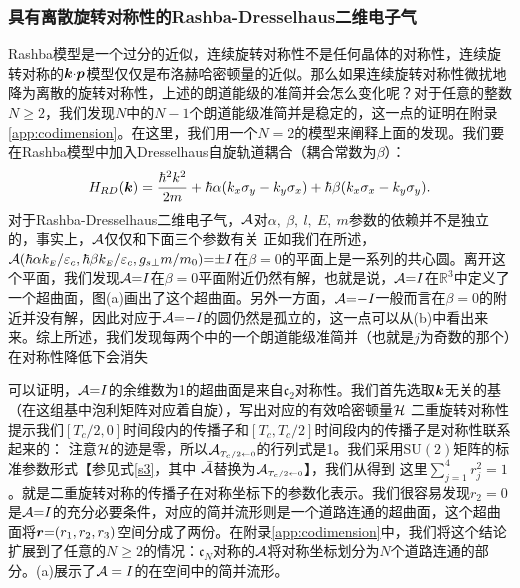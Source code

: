 \subsubsection{具有离散旋转对称性的Rashba-Dresselhaus二维电子气}\label{sec:disrot}

Rashba模型是一个过分的近似，连续旋转对称性不是任何晶体的对称性，连续旋转对称的$\boldsymbol{k}{\cdot}\boldsymbol{p}$模型仅仅是布洛赫哈密顿量的近似。那么如果连续旋转对称性微扰地降为离散的旋转对称性，上述的朗道能级的准简并会怎么变化呢？对于任意的整数$N{\geq}2$，我们发现$N$中的$N{-}1$个朗道能级准简并是稳定的，这一点的证明在附录\ref{app:codimension}。在这里，我们用一个$N{=}2$的模型来阐释上面的发现。我们要在Rashba模型中加入Dresselhaus自旋轨道耦合（耦合常数为$\beta$）：
\begin{equation}
H_{RD}(\boldsymbol{k})=\frac{{\hbar^2}k^2}{2m}+\hbar\alpha(k_{x}\sigma_{y}-k_{y}\sigma_{x})+\hbar\beta(k_{x}\sigma_{x}-k_{y}\sigma_{y}).\label{hamRD}
\end{equation}
对于Rashba-Dresselhaus二维电子气，${\cal A}$对$\alpha,~\beta,~l,~E,~m$参数的依赖并不是独立的，事实上，${\cal A}$仅仅和下面三个参数有关
正如我们在所述，${\cal A}(\hbar\alpha k_{\scriptscriptstyle{E}}/\varepsilon_c,\hbar\beta k_{\scriptscriptstyle{E}}/\varepsilon_c,g_{s\perp}m/m_0){=}{\pm} I$在$\beta{=}0$的平面上是一系列的共心圆。离开这个平面，我们发现${\cal A}{=}I$在$\beta{=}0$平面附近仍然有解，也就是说，${\cal A}{=}I$在$\mathbb{R}^3$中定义了一个超曲面，图(a)画出了这个超曲面。另外一方面，${\cal A}{=}{-}I$一般而言在$\beta{=}0$的附近并没有解，因此对应于${\cal A}{=}{-}I$的圆仍然是孤立的，这一点可以从(b)中看出来来。综上所述，我们发现每两个中的一个朗道能级准简并（也就是$j$为奇数的那个）在对称性降低下会消失

可以证明，${\cal A}{=}I$的余维数为1的超曲面是来自$\mathfrak{c}_2$对称性。我们首先选取$\boldsymbol{k}$无关的基（在这组基中泡利矩阵对应着自旋），写出对应的有效哈密顿量${\cal H}$ 
二重旋转对称性
提示我们$[T_c/2,0]$时间段内的传播子和$[T_c,T_c/2]$时间段内的传播子是对称性联系起来的：
注意${\cal H}$的迹是零，所以${{\cal A}}_{\scriptscriptstyle{T_c/2\leftarrow 0}}$的行列式是1。我们采用$\text{SU}(2)$矩阵的标准参数形式【参见式\ref{s3}，其中 ${\cal \bar{A}}$替换为${{\cal A}}_{\scriptscriptstyle{T_c/2\leftarrow 0}}$】，我们从得到
这里$\sum_{j=1}^4r_j^2{=}1$。就是二重旋转对称的传播子在对称坐标下的参数化表示。我们很容易发现$r_2{=}0$是${\cal A}{=}I$的充分必要条件，对应的简并流形则是一个道路连通的超曲面，这个超曲面将$\boldsymbol{r}{=}(r_1,r_2,r_3)$空间分成了两份。在附录\ref{app:codimension}中，我们将这个结论扩展到了任意的$N{\geq}2$的情况：$\mathfrak{c}_N$对称的${\cal A}$将对称坐标划分为$N$个道路连通的部分。(a)展示了${\cal A}=I$的在空间中的简并流形。

